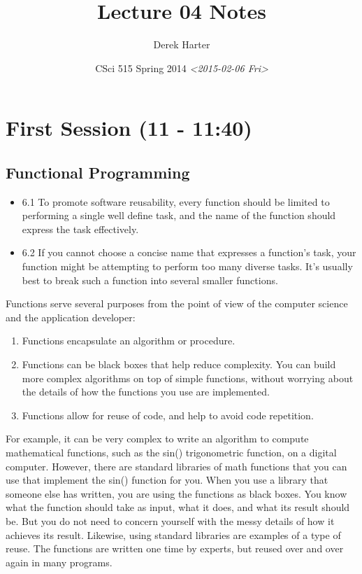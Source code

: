 \documentclass[11pt]{article}
\author{Derek Harter}
\date{CSci 515 Spring 2014 \textit{<2015-02-06 Fri>}}
\title{Lecture 04 Notes}
\begin{document}
\maketitle

\section{First Session (11 - 11:40)}
\label{sec-1}
\subsection{Functional Programming}
\label{sec-1-1}
\begin{itemize}
\item 6.1 To promote software reusability, every function should be
limited to performing a single well define task, and the name of the
function should express the task effectively.
\item 6.2 If you cannot choose a concise name that expresses a function's
task, your function might be attempting to perform too many diverse
tasks.  It's usually best to break such a function into several
smaller functions.
\end{itemize}

Functions serve several purposes from the point of view of the
computer science and the application developer:

\begin{enumerate}
\item Functions encapsulate an algorithm or procedure.
\item Functions can be black boxes that help reduce complexity.  You can
build more complex algorithms on top of simple functions, without
worrying about the details of how the functions you use are
implemented.
\item Functions allow for reuse of code, and help to avoid code repetition.
\end{enumerate}

For example, it can be very complex to write an algorithm to compute
mathematical functions, such as the sin() trigonometric function, on a
digital computer.  However, there are standard libraries of math
functions that you can use that implement the sin() function for you.
When you use a library that someone else has written, you are using
the functions as black boxes.  You know what the function should take
as input, what it does, and what its result should be.  But you do not
need to concern yourself with the messy details of how it achieves its
result.  Likewise, using standard libraries are examples of a type of
reuse.  The functions are written one time by experts, but reused over
and over again in many programs.
\end{document}
